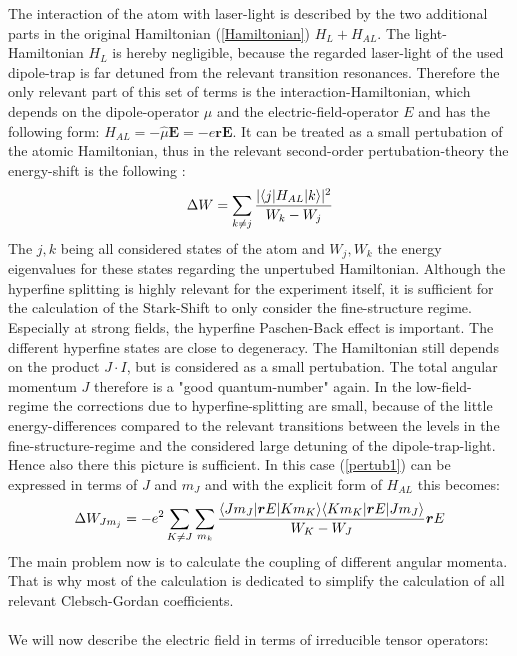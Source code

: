 The interaction of the atom with laser-light is described by the two additional parts in the original Hamiltonian (\ref{Hamiltonian}) $H_L+H_{AL}$. The light-Hamiltonian $H_L$ is hereby negligible, because the regarded laser-light of the used dipole-trap is far detuned from the relevant transition resonances. Therefore the only relevant part of this set of terms is the interaction-Hamiltonian, which depends on the dipole-operator $\mu$ and the electric-field-operator $E$ and has the following form: $H_{AL}=-\hat{\mu} \boldsymbol{E}=-e\boldsymbol{r} \boldsymbol{E}$. It can be treated as a small pertubation of the atomic Hamiltonian, thus in the relevant second-order pertubation-theory the energy-shift is the following \cite{dipole}:
\begin{equation}
\Delta W=\sum_{k\neq j}\frac{|\langle j| H_{AL} | k\rangle|^2}{W_k-W_j}
\label{pertub1}
\end{equation}
The $j,k$ being all considered states of the atom and $W_j,W_k$ the energy eigenvalues for these states regarding the unpertubed Hamiltonian.
Although the hyperfine splitting is highly relevant for the experiment itself, it is sufficient for the calculation of the Stark-Shift to only consider the fine-structure regime. Especially at strong fields, the hyperfine Paschen-Back effect is important. The different hyperfine states are close to degeneracy. The Hamiltonian still depends on the product $J\cdot I$, but is considered as a small pertubation. The total angular momentum $J$ therefore is a "good quantum-number" again. In the low-field-regime the corrections due to hyperfine-splitting are small, because of the little energy-differences compared to the relevant transitions between the levels in the fine-structure-regime and the considered large detuning of the dipole-trap-light. Hence also there this picture is sufficient. In this case (\ref{pertub1}) can be expressed in terms of $J$ and $m_J$ and with the explicit form of $H_{AL}$ this becomes\cite{alpha}:
\begin{equation}
\Delta W_{Jm_j}=-e^2\sum_{K\neq J}\sum_{m_k}\frac{\langle Jm_J| \boldsymbol{r}E | Km_K\rangle\langle Km_K| \boldsymbol{r}E | Jm_J\rangle}{W_K-W_J}\boldsymbol{r}E\label{pertub2}
\end{equation}
The main problem now is to calculate the coupling of different angular momenta. That is why most of the calculation is dedicated to simplify the calculation of all relevant Clebsch-Gordan coefficients.\\\\
We will now describe the electric field in terms of irreducible tensor operators:
